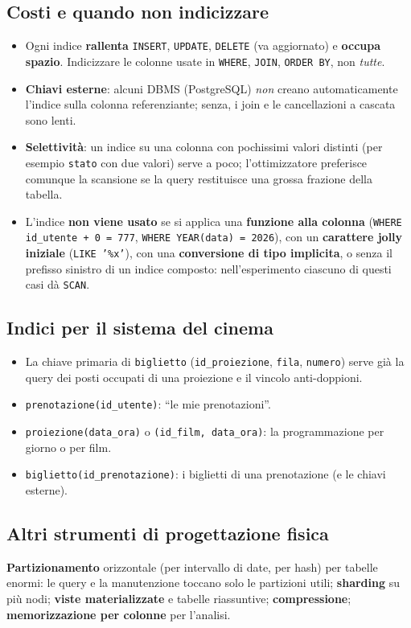 \subsection{Costi e quando non indicizzare}
\begin{itemize}
    \item Ogni indice \textbf{rallenta} \texttt{INSERT}, \texttt{UPDATE}, \texttt{DELETE} (va aggiornato) e \textbf{occupa spazio}. Indicizzare le colonne usate in \texttt{WHERE}, \texttt{JOIN}, \texttt{ORDER BY}, non \emph{tutte}.
    \item \textbf{Chiavi esterne}: alcuni DBMS (PostgreSQL) \emph{non} creano automaticamente l'indice sulla colonna referenziante; senza, i join e le cancellazioni a cascata sono lenti.
    \item \textbf{Selettività}: un indice su una colonna con pochissimi valori distinti (per esempio \texttt{stato} con due valori) serve a poco; l'ottimizzatore preferisce comunque la scansione se la query restituisce una grossa frazione della tabella.
    \item L'indice \textbf{non viene usato} se si applica una \textbf{funzione alla colonna} (\texttt{WHERE id\_utente + 0 = 777}, \texttt{WHERE YEAR(data) = 2026}), con un \textbf{carattere jolly iniziale} (\texttt{LIKE '\%x'}), con una \textbf{conversione di tipo implicita}, o senza il prefisso sinistro di un indice composto: nell'esperimento ciascuno di questi casi dà \texttt{SCAN}.
\end{itemize}

\subsection{Indici per il sistema del cinema}
\begin{itemize}
    \item La chiave primaria di \texttt{biglietto} (\texttt{id\_proiezione}, \texttt{fila}, \texttt{numero}) serve già la query dei posti occupati di una proiezione e il vincolo anti-doppioni.
    \item \texttt{prenotazione(id\_utente)}: ``le mie prenotazioni''.
    \item \texttt{proiezione(data\_ora)} o \texttt{(id\_film, data\_ora)}: la programmazione per giorno o per film.
    \item \texttt{biglietto(id\_prenotazione)}: i biglietti di una prenotazione (e le chiavi esterne).
\end{itemize}

\subsection{Altri strumenti di progettazione fisica}
\textbf{Partizionamento} orizzontale (per intervallo di date, per hash) per tabelle enormi: le query e la manutenzione toccano solo le partizioni utili; \textbf{sharding} su più nodi; \textbf{viste materializzate} e tabelle riassuntive; \textbf{compressione}; \textbf{memorizzazione per colonne} per l'analisi.

